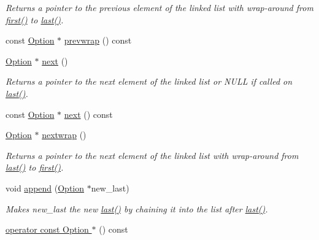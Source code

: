 \begin{DoxyCompactItemize}
\begin{DoxyCompactList}\small\item\em Returns a pointer to the previous element of the linked list with wrap-\/around from \hyperlink{classoption_1_1_option_abb4e13cd7c90999c8a6b1f871cece283}{first()} to \hyperlink{classoption_1_1_option_afe2aff68191e55b59c53fac3dbbcd7c3}{last()}. \end{DoxyCompactList}\item 
const \hyperlink{classoption_1_1_option}{Option} $\ast$ \hyperlink{classoption_1_1_option_a8bf33184c360cd794d9d337c8f8044b3}{prevwrap} () const
\item 
\hyperlink{classoption_1_1_option}{Option} $\ast$ \hyperlink{classoption_1_1_option_a59ae9aed505f4d410633bb36478a32be}{next} ()
\begin{DoxyCompactList}\small\item\em Returns a pointer to the next element of the linked list or N\+U\+LL if called on \hyperlink{classoption_1_1_option_afe2aff68191e55b59c53fac3dbbcd7c3}{last()}. \end{DoxyCompactList}\item 
const \hyperlink{classoption_1_1_option}{Option} $\ast$ \hyperlink{classoption_1_1_option_a5ffc96c24288bb1fa9330ebb62da7da6}{next} () const
\item 
\hyperlink{classoption_1_1_option}{Option} $\ast$ \hyperlink{classoption_1_1_option_ae8d8c058af3c781cb1d444998df48fef}{nextwrap} ()
\begin{DoxyCompactList}\small\item\em Returns a pointer to the next element of the linked list with wrap-\/around from \hyperlink{classoption_1_1_option_afe2aff68191e55b59c53fac3dbbcd7c3}{last()} to \hyperlink{classoption_1_1_option_abb4e13cd7c90999c8a6b1f871cece283}{first()}. \end{DoxyCompactList}\item 
void \hyperlink{classoption_1_1_option_a59030822a1ec4e667e6c288d7e5ec961}{append} (\hyperlink{classoption_1_1_option}{Option} $\ast$new\+\_\+last)
\begin{DoxyCompactList}\small\item\em Makes {\ttfamily new\+\_\+last} the new \hyperlink{classoption_1_1_option_afe2aff68191e55b59c53fac3dbbcd7c3}{last()} by chaining it into the list after \hyperlink{classoption_1_1_option_afe2aff68191e55b59c53fac3dbbcd7c3}{last()}. \end{DoxyCompactList}\item 
\hyperlink{classoption_1_1_option_a3c0504baaa809c622d59c2c09f83e25b}{operator const Option $\ast$} () const

\end{DoxyCompactItemize}
